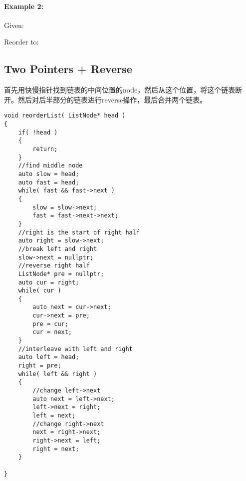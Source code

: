 \paragraph{Example 2:}
\begin{flushleft}
Given:
\begin{figure}[H]
\end{figure}
Reorder to:
\begin{figure}[H]
\end{figure}
\end{flushleft}
\subsection{Two Pointers + Reverse}
首先用快慢指针找到链表的中间位置的node，然后从这个位置，将这个链表断开。然后对后半部分的链表进行reverse操作，最后合并两个链表。
\setcounter{lstlisting}{0}
\begin{lstlisting}[style=customc, caption={Two Pointers}]
void reorderList( ListNode* head )
{
    if( !head )
    {
        return;
    }
    //find middle node
    auto slow = head;
    auto fast = head;
    while( fast && fast->next )
    {
        slow = slow->next;
        fast = fast->next->next;
    }
    //right is the start of right half
    auto right = slow->next;
    //break left and right
    slow->next = nullptr;
    //reverse right half
    ListNode* pre = nullptr;
    auto cur = right;
    while( cur )
    {
        auto next = cur->next;
        cur->next = pre;
        pre = cur;
        cur = next;
    }
    //interleave with left and right
    auto left = head;
    right = pre;
    while( left && right )
    {
        //change left->next
        auto next = left->next;
        left->next = right;
        left = next;
        //change right->next
        next = right->next;
        right->next = left;
        right = next;
    }

}
\end{lstlisting}
